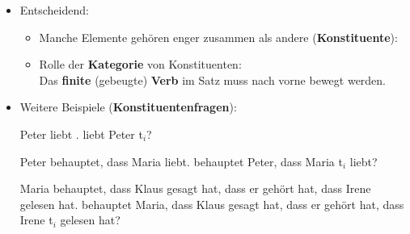 \begin{frame}

\begin{itemize}

	\item Entscheidend:
		\begin{itemize}
			\item Manche Elemente gehören enger zusammen als andere (\ras \textbf{Konstituente}): 

			\z
			
			\item Rolle der \textbf{Kategorie} von Konstituenten:\\
			\ras Das \textbf{finite} (gebeugte) \textbf{Verb} im Satz muss nach vorne bewegt werden.
			
			\z
			
		\end{itemize}

\end{itemize}

\end{frame}


\begin{frame}

\begin{itemize}

	\item Weitere Beispiele (\textbf{Konstituentenfragen}):

	\eal
	\ex Peter liebt .
	\ex {} liebt Peter t$_i$?
	\zl

\pause

	\eal 
	\ex Peter behauptet, dass Maria  liebt. 
	\ex {} behauptet Peter, dass Maria t$_i$ liebt? 
	\zl

\pause

	\eal
	\zl

\pause

	\eal 
	\ex Maria behauptet, dass Klaus gesagt hat, dass er gehört hat, 	dass Irene  gelesen hat. 
	\ex {} behauptet Maria, dass Klaus gesagt hat, dass er gehört hat, dass Irene t$_i$ gelesen hat?
	\zl

\end{itemize}

\end{frame}


